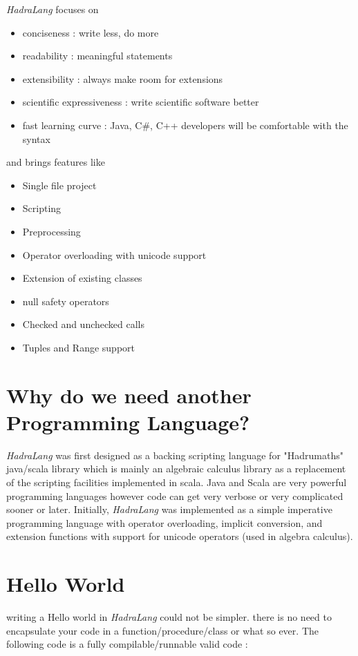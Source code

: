 \documentclass{tufte-book}
\begin{document}
        \textit{HadraLang} focuses on
        \begin{itemize}
        \item conciseness : write less, do more
        \item readability : meaningful statements
        \item extensibility : always make room for extensions
        \item scientific expressiveness : write scientific software better
        \item fast learning curve : Java, C\#, C++ developers will be comfortable with the syntax
        \end{itemize}

        and brings features like
        \begin{itemize}
        \item Single file project
        \item Scripting
        \item Preprocessing
        \item Operator overloading with unicode support
        \item Extension of existing classes
        \item null safety operators
        \item Checked and unchecked calls
        \item Tuples and Range support
        \end{itemize}


        \section*{Why do we need another Programming Language?}
        \textit{HadraLang} was first designed as a backing scripting language for "Hadrumaths" java/scala library which is mainly an algebraic calculus library as a replacement of the scripting facilities implemented in scala. Java and Scala are very powerful programming languages however code can get very verbose or very complicated sooner or later.        
        Initially, \textit{HadraLang} was implemented as a simple imperative programming language with operator overloading, implicit conversion, and extension functions with support for unicode operators (used in algebra calculus).
        
        
        \section*{Hello World}
        writing a Hello world in \textit{HadraLang} could not be simpler. there is no need to encapsulate your code in a function/procedure/class or what so ever.
        The following code is a fully compilable/runnable valid code :
        
\end{document}
